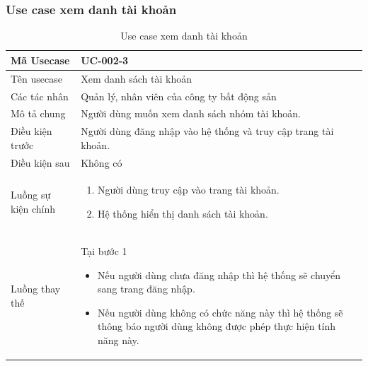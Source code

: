 \documentclass[12pt,a4paper]{article}
\begin{document}
    \subsubsection*{Use case xem danh tài khoản }
    \begin{table}[H]
        \centering
        \begin{tabular}{|p{3.5cm}|p{11.5cm}|c|}
            \hline
            Mã Usecase      & UC-002-3                                                       \\
            \hline
            Tên usecase     & Xem danh sách tài khoản                                        \\
            \hline
            Các tác nhân    & Quản lý, nhân viên của công ty bất động sản                    \\
            \hline
            Mô tả chung     & Người dùng muốn xem danh sách nhóm tài khoản.                  \\
            \hline
            Điều kiện trước & Người dùng đăng nhập vào hệ thống và truy cập trang tài khoản. \\
            \hline
            Điều kiện sau   & Không có                                                       \\
            \hline
            Luồng sự kiện chính & \vspace{-.8cm}\begin{enumerate}
                                                    \item Người dùng truy cập vào trang tài khoản.
                                                    \item Hệ thống hiển thị danh sách tài khoản.
            \end{enumerate}
            \\
            \hline
            Luồng thay thế & Tại bước 1\newline
            \vspace{-.8cm}\begin{itemize}
                              \item Nếu người dùng chưa đăng nhập thì hệ thống sẽ chuyển sang trang đăng nhập.
                              \item  Nếu người dùng không có chức năng này thì hệ thống sẽ thông báo người dùng không được phép thực hiện tính năng này.
            \end{itemize}

            \\    \hline
        \end{tabular}
        \caption{Use case xem danh tài khoản }
    \end{table}
\end{document}
